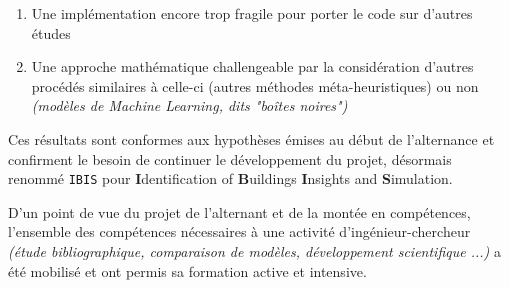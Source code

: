 \begin{enumerate}
    \item Une implémentation encore trop fragile pour porter le code sur d'autres études
    \item Une approche mathématique challengeable par la considération d'autres procédés similaires à celle-ci (autres méthodes méta-heuristiques) ou non \textit{(modèles de Machine Learning, dits "boîtes noires")}
\end{enumerate}

Ces résultats sont conformes aux hypothèses émises au début de l'alternance et confirment le besoin de continuer le développement du projet, désormais renommé \texttt{IBIS} pour \textbf Identification of \textbf Buildings \textbf Insights and \textbf Simulation.

D'un point de vue du projet de l'alternant et de la montée en compétences, l'ensemble des compétences nécessaires à une activité d'ingénieur-chercheur \textit{(étude bibliographique, comparaison de modèles, développement scientifique ...)} a été mobilisé et ont permis sa formation active et intensive.


